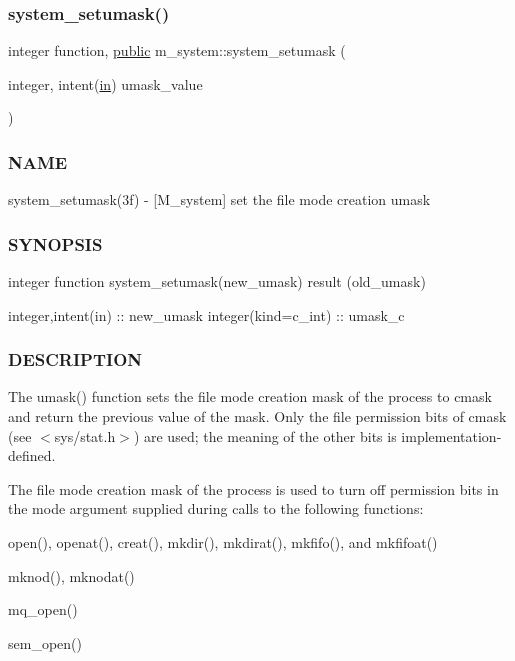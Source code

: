 \subsubsection{\texorpdfstring{system\+\_\+setumask()}{system\_setumask()}}
{\footnotesize\ttfamily integer function, \hyperlink{M__stopwatch_83_8txt_a2f74811300c361e53b430611a7d1769f}{public} m\+\_\+system\+::system\+\_\+setumask (\begin{DoxyParamCaption}\item[{integer, intent(\hyperlink{M__journal_83_8txt_afce72651d1eed785a2132bee863b2f38}{in})}]{umask\+\_\+value }\end{DoxyParamCaption})}



\subsubsection*{N\+A\+ME}

system\+\_\+setumask(3f) -\/ \mbox{[}M\+\_\+system\mbox{]} set the file mode creation umask \subsubsection*{S\+Y\+N\+O\+P\+S\+IS}

integer function system\+\_\+setumask(new\+\_\+umask) result (old\+\_\+umask)

integer,intent(in) \+:\+: new\+\_\+umask integer(kind=c\+\_\+int) \+:\+: umask\+\_\+c

\subsubsection*{D\+E\+S\+C\+R\+I\+P\+T\+I\+ON}

The umask() function sets the file mode creation mask of the process to cmask and return the previous value of the mask. Only the file permission bits of cmask (see $<$sys/stat.\+h$>$) are used; the meaning of the other bits is implementation-\/defined.

The file mode creation mask of the process is used to turn off permission bits in the mode argument supplied during calls to the following functions\+:


\begin{DoxyItemize}
\item open(), openat(), creat(), mkdir(), mkdirat(), mkfifo(), and mkfifoat()
\item mknod(), mknodat()
\item mq\+\_\+open()
\item sem\+\_\+open()
\end{DoxyItemize}

